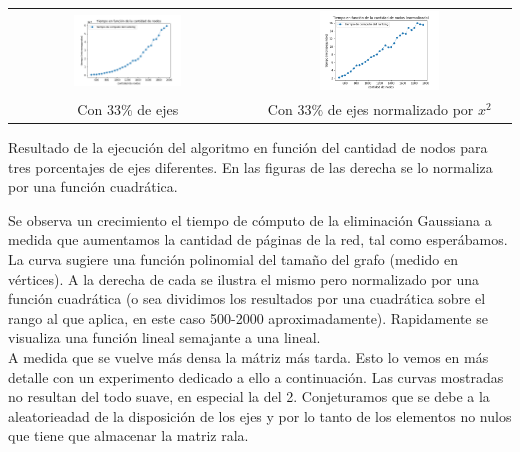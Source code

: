 \begin{minipage}{\textwidth}
\begin{center}
\begin{tabular}{cc}
      \includegraphics[width=0.475\textwidth]{img/tiempo_nodos_prop_500-2000_solo_e3.png} 
       & \includegraphics[width=0.475\textwidth]{img/tiempo_nodos_prop_500-2000-normalizado-e3.png} \\
             Con $33\%$ de ejes & Con $33\%$ de ejes normalizado por $x^{2}$ \\
                    \end{tabular}

                    \vspace{1em}

Resultado de la ejecución del algoritmo en función del cantidad de nodos para tres porcentajes de ejes diferentes. En las figuras de las derecha se lo normaliza por una función cuadrática.

                    \vspace{1em}
                \end{center}
                \label{fig:exp1-nodos}
            \end{minipage}

Se observa un crecimiento el tiempo de cómputo de la eliminación Gaussiana a medida que aumentamos la cantidad de páginas de la red, tal como esperábamos. La curva sugiere una función polinomial del tamaño del grafo (medido en vértices). A la derecha de cada se ilustra el mismo pero normalizado por una función cuadrática (o sea dividimos los resultados por una cuadrática sobre el rango al que aplica, en este caso 500-2000 aproximadamente). Rapidamente se visualiza una función lineal semajante a una lineal.\\

A medida que se vuelve más densa la mátriz más tarda. Esto lo vemos en más detalle con un experimento dedicado a ello a continuación. Las curvas mostradas no resultan del todo suave, en especial la del 2. Conjeturamos que se debe a la aleatorieadad de la disposición de los ejes y por lo tanto de los elementos no nulos que tiene que almacenar la matriz rala. \\

